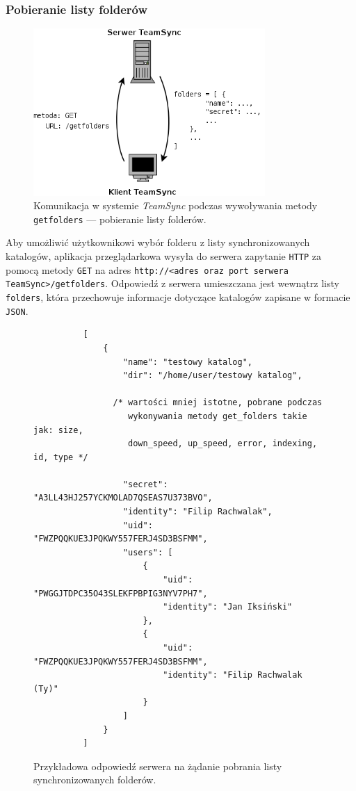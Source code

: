 \documentclass[polish,a4paper,twoside]{ppfcmthesis}
\begin{document}
\subsubsection*{Pobieranie listy folderów}

\begin{figure}[h!]
  \vspace{5pt}
  \begin{center}
    \includegraphics[width=250pt]{figures/metgetfolders.png}
  \end{center}
  \caption{Komunikacja w systemie \emph{TeamSync} podczas wywoływania metody \texttt{getfolders} --- pobieranie listy folderów.}
  \label{picmetgetfolders}
\end{figure}

Aby umożliwić użytkownikowi wybór folderu z listy synchronizowanych katalogów, aplikacja przeglądarkowa wysyła do serwera zapytanie \texttt{HTTP} za pomocą metody \texttt{GET} na adres \texttt{http://<adres oraz port serwera TeamSync>\-/getfolders}. Odpowiedź z serwera umieszczana jest wewnątrz listy \texttt{folders}, która przechowuje informacje dotyczące katalogów zapisane w formacie \texttt{JSON}.

\begin{figure}[htb!]
\label{newcommentrequest}
  \begin{verbatim}
          [
              {
                  "name": "testowy katalog", 
                  "dir": "/home/user/testowy katalog", 
              
                /* wartości mniej istotne, pobrane podczas
                   wykonywania metody get_folders takie jak: size,
                   down_speed, up_speed, error, indexing, id, type */
         
                  "secret": "A3LL43HJ257YCKMOLAD7QSEAS7U373BVO", 
                  "identity": "Filip Rachwalak", 
                  "uid": "FWZPQQKUE3JPQKWY557FERJ4SD3BSFMM", 
                  "users": [
                      {
                          "uid": "PWGGJTDPC35O43SLEKFPBPIG3NYV7PH7", 
                          "identity": "Jan Iksiński"
                      }, 
                      {
                          "uid": "FWZPQQKUE3JPQKWY557FERJ4SD3BSFMM", 
                          "identity": "Filip Rachwalak (Ty)"
                      }
                  ]
              }
          ]
  \end{verbatim}
  \caption{Przykładowa odpowiedź serwera na żądanie pobrania listy synchronizowanych folderów.}
\end{figure}
\end{document}
